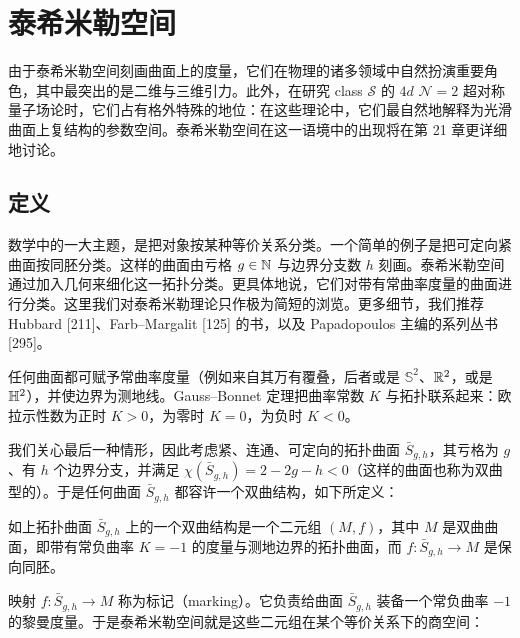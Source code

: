 \chapter{泰希米勒空间}


由于泰希米勒空间刻画曲面上的度量，它们在物理的诸多领域中自然扮演重要角色，其中最突出的是二维与三维引力。此外，在研究 class $\mathcal{S}$ 的 $4d$ $\mathcal{N}=2$ 超对称量子场论时，它们占有格外特殊的地位：在这些理论中，它们最自然地解释为光滑曲面上复结构的参数空间。泰希米勒空间在这一语境中的出现将在第 21 章更详细地讨论。

\section{定义}

数学中的一大主题，是把对象按某种等价关系分类。一个简单的例子是把可定向紧曲面按同胚分类。这样的曲面由亏格 $g\in\mathbb{N}$ 与边界分支数 $h$ 刻画。泰希米勒空间通过加入几何来细化这一拓扑分类。更具体地说，它们对带有常曲率度量的曲面进行分类。这里我们对泰希米勒理论只作极为简短的浏览。更多细节，我们推荐 Hubbard [211]、Farb–Margalit [125] 的书，以及 Papadopoulos 主编的系列丛书 [295]。

任何曲面都可赋予常曲率度量（例如来自其万有覆叠，后者或是 $\mathbb{S}^2$、$\mathbb{R}^2$，或是 $\mathbb{H}^2$），并使边界为测地线。Gauss–Bonnet 定理把曲率常数 $K$ 与拓扑联系起来：欧拉示性数为正时 $K>0$，为零时 $K=0$，为负时 $K<0$。

我们关心最后一种情形，因此考虑紧、连通、可定向的拓扑曲面 $\bar S_{g,h}$，其亏格为 $g$、有 $h$ 个边界分支，并满足 $\chi(\bar S_{g,h})=2-2g-h<0$（这样的曲面也称为双曲型的）。于是任何曲面 $\bar S_{g,h}$ 都容许一个双曲结构，如下所定义：

\begin{definition}[6.1] 如上拓扑曲面 $\bar S_{g,h}$ 上的一个双曲结构是一个二元组 $(M,f)$，其中 $M$ 是双曲曲面，即带有常负曲率 $K=-1$ 的度量与测地边界的拓扑曲面，而 $f:\bar S_{g,h}\to M$ 是保向同胚。\end{definition}

映射 $f:\bar S_{g,h}\to M$ 称为标记（marking）。它负责给曲面 $\bar S_{g,h}$ 装备一个常负曲率 $-1$ 的黎曼度量。于是泰希米勒空间就是这些二元组在某个等价关系下的商空间：

